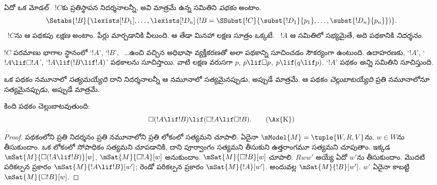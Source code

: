 \documentclass[../../../include/open-logic-section]{subfiles}
\begin{document}


\begin{defn}
  ఏదో ఒక మోడల్ ~$!C$కు
  ప్రతిస్థాపన నిదర్శనాలన్నీ, అవి మాత్రమే ఉన్న
   సమితిని \emph{పథకం} అంటాం.
  \[
  \Setabs{!B}{\lexists[!D_1], \dots, \lexists[!D_n] \left(!B =
  \SSubst{!C}{\subst{!D_1}{p_1}, \dots, \subst{!D_n}{p_n}} \right) }.
  \]
  ~$!C$ను ఆ పథకపు
  \emph{లక్షణ}  అంటాం.
   పేర్లు మార్చడానికి వీలుంది. ఆ తేడా మినహా లక్షణ సూత్రం ఒక్కటే.
  ~$!A$ ఆ సమితిలో
  సభ్యమైతే, అది పథకానికి \emph{నిదర్శనం}.
\end{defn}

$!C$ పరమాణు భాగాల స్థానంలో ‘$!A$’, ‘$!B$’,
~\dots ఉంచి వచ్చిన అధిభాషా వ్యక్తీకరణతో
అలా పథకాన్ని సూచించడం సౌకర్యంగా ఉంటుంది. ఉదాహరణకు,
‘$!A$’, ‘$!A \lif \Box!A$’,
‘$!A \lif (!B \lif !A)$’ పథకాలను సూచిస్తాయి.
వాటి లక్షణ 
వరుసగా $p$, $p \lif \Box p$, $p \lif (q
\lif p)$. ‘$!A$’ పథకం \emph{అన్ని}
 సమితిని సూచిస్తుంది.

\begin{defn}
  ఒక పథకం నమూనాలో \emph{సత్యమయ్యేది} దాని నిదర్శనాలన్నీ
  ఆ నమూనాలో సత్యమైనప్పుడు, అప్పుడే మాత్రమే. ఆ పథకం \emph{చెల్లుబాటయ్యేది}
  ప్రతి నమూనాలోనూ సత్యమైనప్పుడు, అప్పుడే మాత్రమే.
\end{defn}

\begin{prop}
  కింది  పథకం చెల్లుబాటవుతుంది:
  \begin{equation*}
  \Box(!A \lif !B) \lif (\Box !A \lif \Box !B). \tag{\Ax{K}}
  \end{equation*}
\end{prop}

\begin{proof}
  పథకంలోని ప్రతి నిదర్శనం ప్రతి నమూనాలోని
  ప్రతి లోకంలో సత్యమని చూపాలి. ఏదైనా
  $\mModel{M} = \tuple{W,R,V}$ను,
  $w \in W$ను తీసుకుందాం. ఒక లోకంలో
  సోపాధికం సత్యమని చూపడానికి, దాని
  పూర్వాంగం సత్యమని తీసుకుని ఉత్తరాంగమూ
  సత్యమని చూపుతాం. ఇక్కడ
  $\mSat{M}{\Box(!A \lif !B)}[w]$,
  $\mSat{M}{\Box !A}[w]$ అనుకుందాం.
  $\mSat{M}{\Box !B}[w]$ చూపాలి.
  $Rww'$ అయ్యే ఏదో $w'$ను తీసుకుందాం.
  మొదటి పరికల్పన ప్రకారం
  $\mSat{M}{!A \lif !B}[w']$;
  రెండో పరికల్పన ప్రకారం $\mSat{M}{!A}[w']$.
  అందువల్ల $\mSat{M}{!B}[w']$.
  $w'$ ఏదైనా కాబట్టి $\mSat{M}{\Box !B}[w]$.
\end{proof}
\end{document}
